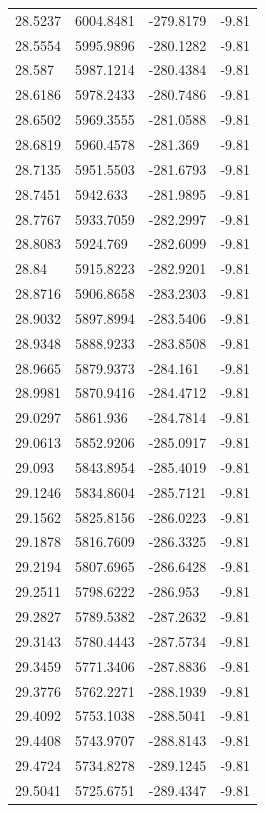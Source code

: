 \begin{table}[H]
\begin{tabular}{llll}
28.5237 & 6004.8481 & -279.8179 & -9.81 \\
28.5554 & 5995.9896 & -280.1282 & -9.81 \\
28.587 & 5987.1214 & -280.4384 & -9.81 \\
28.6186 & 5978.2433 & -280.7486 & -9.81 \\
28.6502 & 5969.3555 & -281.0588 & -9.81 \\
28.6819 & 5960.4578 & -281.369 & -9.81 \\
28.7135 & 5951.5503 & -281.6793 & -9.81 \\
28.7451 & 5942.633 & -281.9895 & -9.81 \\
28.7767 & 5933.7059 & -282.2997 & -9.81 \\
28.8083 & 5924.769 & -282.6099 & -9.81 \\
28.84 & 5915.8223 & -282.9201 & -9.81 \\
28.8716 & 5906.8658 & -283.2303 & -9.81 \\
28.9032 & 5897.8994 & -283.5406 & -9.81 \\
28.9348 & 5888.9233 & -283.8508 & -9.81 \\
28.9665 & 5879.9373 & -284.161 & -9.81 \\
28.9981 & 5870.9416 & -284.4712 & -9.81 \\
29.0297 & 5861.936 & -284.7814 & -9.81 \\
29.0613 & 5852.9206 & -285.0917 & -9.81 \\
29.093 & 5843.8954 & -285.4019 & -9.81 \\
29.1246 & 5834.8604 & -285.7121 & -9.81 \\
29.1562 & 5825.8156 & -286.0223 & -9.81 \\
29.1878 & 5816.7609 & -286.3325 & -9.81 \\
29.2194 & 5807.6965 & -286.6428 & -9.81 \\
29.2511 & 5798.6222 & -286.953 & -9.81 \\
29.2827 & 5789.5382 & -287.2632 & -9.81 \\
29.3143 & 5780.4443 & -287.5734 & -9.81 \\
29.3459 & 5771.3406 & -287.8836 & -9.81 \\
29.3776 & 5762.2271 & -288.1939 & -9.81 \\
29.4092 & 5753.1038 & -288.5041 & -9.81 \\
29.4408 & 5743.9707 & -288.8143 & -9.81 \\
29.4724 & 5734.8278 & -289.1245 & -9.81 \\
29.5041 & 5725.6751 & -289.4347 & -9.81 \\

\end{tabular}
\end{table}
